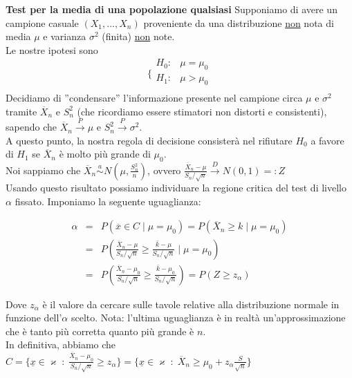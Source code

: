 \textbf{Test per la media di una popolazione qualsiasi} Supponiamo di avere un campione casuale $(X_1,...,X_n)$ proveniente da una distribuzione \underline{non} nota di media $\mu$ e varianza $\sigma^2$ (finita) \underline{non} note.\\
Le nostre ipotesi sono 
$$\bigg \{
\begin{array}{rl}
H_0: & \mu=\mu_0 \\
H_1: & \mu>\mu_0 \\
\end{array}
$$
Decidiamo di ''condensare'' l'informazione presente nel campione circa $\mu$ e $\sigma^2$ tramite $\overline{X}_n$ e $S_n^2$ (che ricordiamo essere stimatori non distorti e consistenti), sapendo che $\overline{X}_n \stackrel{P}{\rightarrow} \mu$ e $S_n^2 \stackrel{P}{\rightarrow} \sigma^2$.\\
A questo punto, la nostra regola di decisione consisterà nel rifiutare $H_0$ a favore di $H_1$ se $\overline{X}_n$ è molto più grande di $\mu_0$.\\
Noi sappiamo che $\overline{X}_n \stackrel{a}{\sim} N \left( \mu, \frac{S_n^2}{n}\right)$, ovvero $\frac{\overline{X}_n-\mu}{S_n/\sqrt{n}} \stackrel{D}{\rightarrow} N(0,1) =: Z$\\
Usando questo risultato possiamo individuare la regione critica del test di livello $\alpha$ fissato. Imponiamo la seguente uguaglianza:

\begin{eqnarray}
\alpha 	&=& P(\overline{x} \in C \mid \mu=\mu_0) = P(\overline{X}_n \geq k \mid \mu=\mu_0) \nonumber \\
		&=& P \left( \frac{\overline{X}_n-\mu}{S_n/\sqrt{n}} \geq \frac{\overline{k}-\mu}{S_n/\sqrt{n}} \mid \mu=\mu_0 \right) \nonumber \\
		&=& P \left( \frac{\overline{X}_n-\mu_0}{S_n/\sqrt{n}} \geq \frac{\overline{k}-\mu_0}{S_n/\sqrt{n}} \right) = P(Z \geq z_{\alpha}) \nonumber
\end{eqnarray}

Dove $z_{\alpha}$ è il valore da cercare sulle tavole relative alla distribuzione normale in funzione dell'$\alpha$ scelto. Nota: l'ultima uguaglianza è in realtà un'approssimazione che è tanto più corretta quanto più grande è $n$.\\
In definitiva, abbiamo che $C = \lbrace \underline{x} \in \varkappa \; : \; \frac{\overline{X}_n-\mu_0}{S_n/\sqrt{n}} \geq z_{\alpha} \rbrace = \lbrace \underline{x} \in \varkappa \; : \; \overline{X}_n \geq \mu_0 + z_{\alpha} \frac{S}{\sqrt{n}} \rbrace$\\

